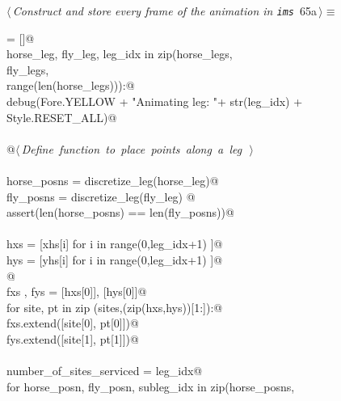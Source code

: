 \documentclass[11.5pt]{report}
\begin{document}
\begin{flushleft} \small
\begin{minipage}{\linewidth}\label{scrap94}\raggedright\small
{} $\langle\,${\itshape Construct and store every frame of the animation in \verb|ims|}\nobreak\ {\footnotesize {65a}}$\,\rangle\equiv$
\vspace{-1ex}
\begin{list}{}{} \item
\mbox{}\verb@ims = []@\\
\mbox{}\verb@for horse_leg, fly_leg, leg_idx in zip(horse_legs, \@\\
\mbox{}\verb@                                       fly_legs,   \@\\
\mbox{}\verb@                                       range(len(horse_legs))):@\\
\mbox{}\verb@     debug(Fore.YELLOW + "Animating leg: "+ str(leg_idx) + Style.RESET_ALL)@\\
\mbox{}\verb@@\\
\mbox{}\verb@     @\hbox{$\langle\,${\itshape Define function to place points along a leg}\nobreak\ {\footnotesize {}}$\,\rangle$}\verb@@\\
\mbox{}\verb@@\\
\mbox{}\verb@     horse_posns = discretize_leg(horse_leg)@\\
\mbox{}\verb@     fly_posns   = discretize_leg(fly_leg) @\\
\mbox{}\verb@     assert(len(horse_posns) == len(fly_posns))@\\
\mbox{}\verb@@\\
\mbox{}\verb@     hxs = [xhs[i] for i in range(0,leg_idx+1) ]@\\
\mbox{}\verb@     hys = [yhs[i] for i in range(0,leg_idx+1) ]@\\
\mbox{}\verb@           @\\
\mbox{}\verb@     fxs , fys = [hxs[0]], [hys[0]]@\\
\mbox{}\verb@     for site, pt in zip (sites,(zip(hxs,hys))[1:]):@\\
\mbox{}\verb@          fxs.extend([site[0], pt[0]])@\\
\mbox{}\verb@          fys.extend([site[1], pt[1]])@\\
\mbox{}\verb@@\\
\mbox{}\verb@     number_of_sites_serviced = leg_idx@\\
\mbox{}\verb@     for horse_posn, fly_posn, subleg_idx in zip(horse_posns, \@\\

\end{list}
\end{minipage}
\end{flushleft}
\end{document}
